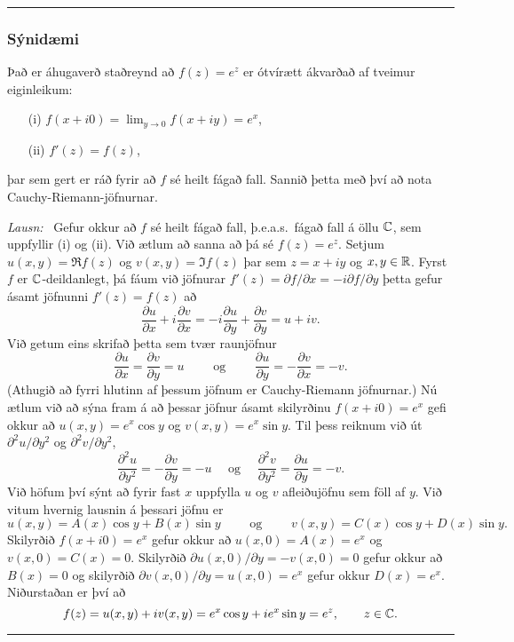 \bigskip\hrule\bigskip

\subsubsection{Sýnidæmi}
Það er áhugaverð staðreynd að $f(z)=e^z$ er ótvírætt
ákvarðað af tveimur eiginleikum: \ 
\begin{enumerate}
\item[(i)] $f(x+i0)=\lim_{y\to 0}f(x+iy)=e^x$, 
\item[(ii)] $f'(z)=f(z)$,
\end{enumerate}
þar sem gert er ráð fyrir að 
$f$ sé heilt fágað fall. Sannið þetta með því að nota
Cauchy-Riemann-jöfnurnar.

\smallskip\noindent
{\it Lausn:} \ Gefur okkur að $f$ sé heilt fágað fall, þ.e.a.s.~fágað
fall á öllu ${\mathbb C}$, sem uppfyllir (i) og (ii).  Við ætlum að sanna að þá
sé $f(z)=e^z$.  Setjum $u(x,y)=\Re f(z)$ og $v(x,y)=\Im f(z)$ þar sem
$z=x+iy$ og $x,y\in {\mathbb R}$.  Fyrst $f$ er ${\mathbb C}$-deildanlegt, þá fáum við jöfnurar
$f'(z)=\partial f/\partial x=-i\partial f/\partial y$ þetta gefur ásamt jöfnunni
$f'(z)=f(z)$ að
$$
\dfrac {\partial u}{\partial x}+i\dfrac {\partial v}{\partial x}=
-i\dfrac {\partial u}{\partial y}+\dfrac {\partial v}{\partial y}=u+iv.
$$ 
Við getum eins skrifað þetta sem tvær raunjöfnur
$$
\dfrac {\partial u}{\partial x}=\dfrac {\partial v}{\partial y}=u
\qquad \text{ og } \qquad \dfrac {\partial u}{\partial y}=-\dfrac
{\partial v}{\partial x}=-v.
$$
(Athugið að fyrri hlutinn af þessum jöfnum er Cauchy-Riemann
jöfnurnar.)  Nú ætlum við að sýna fram á að þessar jöfnur ásamt
skilyrðinu $f(x+i0)=e^x$ gefi okkur að $u(x,y)=e^x\cos y$ og
$v(x,y)=e^x\sin y$.  Til þess reiknum við út $\partial^2u/\partial
y^2$ og $\partial^2v/\partial y^2$,
$$
\dfrac{\partial^2u}{\partial y^2}=-\dfrac{\partial v}{\partial y}=-u
\quad \text{ og } \quad 
\dfrac{\partial^2v}{\partial y^2}=\dfrac{\partial u}{\partial y}=-v.
$$
Við höfum því sýnt að fyrir fast $x$ uppfylla $u$ og $v$ afleiðujöfnu
sem föll af $y$.  Við vitum hvernig lausnin á þessari jöfnu er
$$
u(x,y)=A(x)\cos y+ B(x)\sin y \qquad \text{ og } \qquad
v(x,y)=C(x)\cos y+D(x)\sin y.
$$
Skilyrðið $f(x+i0)=e^x$ gefur okkur að $u(x,0)=A(x)=e^x$ og
$v(x,0)=C(x)=0$.  Skilyrðið $\partial u(x,0)/\partial y=-v(x,0)=0$
gefur okkur að $B(x)=0$ og skilyrðið $\partial v(x,0)/\partial
y=u(x,0)=e^x$ gefur okkur $D(x)=e^x$.  Niðurstaðan er því að
$$
f(z)=u(x,y)+iv(x,y)=e^x\cos y+ie^x\sin y=e^z,\qquad z\in {\mathbb C}.
$$


\bigskip\hrule\bigskip


